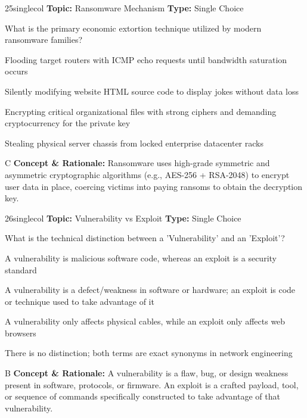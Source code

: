 \begin{qcard}{25}{singlecol}
\textcolor{darkslate!75}{\small\textbf{Topic:} Ransomware Mechanism \hfill \textbf{Type:} Single Choice}\vspace{0.4em}\par
What is the primary economic extortion technique utilized by modern ransomware families?
\begin{qoptions}
\item Flooding target routers with ICMP echo requests until bandwidth saturation occurs
\item Silently modifying website HTML source code to display jokes without data loss
\item Encrypting critical organizational files with strong ciphers and demanding cryptocurrency for the private key
\item Stealing physical server chassis from locked enterprise datacenter racks
\end{qoptions}
\end{qcard}
\nopagebreak
\begin{explainbox}{C}
\textbf{Concept \& Rationale:} Ransomware uses high-grade symmetric and asymmetric cryptographic algorithms (e.g., AES-256 + RSA-2048) to encrypt user data in place, coercing victims into paying ransoms to obtain the decryption key.
\end{explainbox}

\begin{qcard}{26}{singlecol}
\textcolor{darkslate!75}{\small\textbf{Topic:} Vulnerability vs Exploit \hfill \textbf{Type:} Single Choice}\vspace{0.4em}\par
What is the technical distinction between a 'Vulnerability' and an 'Exploit'?
\begin{qoptions}
\item A vulnerability is malicious software code, whereas an exploit is a security standard
\item A vulnerability is a defect/weakness in software or hardware; an exploit is code or technique used to take advantage of it
\item A vulnerability only affects physical cables, while an exploit only affects web browsers
\item There is no distinction; both terms are exact synonyms in network engineering
\end{qoptions}
\end{qcard}
\nopagebreak
\begin{explainbox}{B}
\textbf{Concept \& Rationale:} A vulnerability is a flaw, bug, or design weakness present in software, protocols, or firmware. An exploit is a crafted payload, tool, or sequence of commands specifically constructed to take advantage of that vulnerability.
\end{explainbox}

